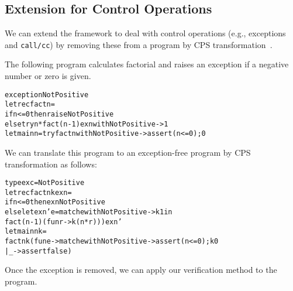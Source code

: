 \subsection{Extension for Control Operations}
\label{sec:control} We can extend the framework to deal with control
operations (e.g., exceptions and \texttt{call/cc}) by removing these
from a program by CPS transformation~\cite{Nielsen2001}.

The following program calculates factorial and raises an exception if
a negative number or zero is given.
\begin{alltt}
exception NotPositive
let rec fact n =
  if n <= 0 then raise NotPositive
  else try n * fact (n - 1) exn with NotPositive -> 1
let main n = try fact n with NotPositive -> assert (n <= 0); 0
\end{alltt}
We can translate this program to an exception-free program by CPS transformation as follows:
\begin{alltt}
type exc = NotPositive
let rec fact n k exn =
  if n <= 0 then exn NotPositive
  else let exn' e = match e with NotPositive -> k 1 in
         fact (n - 1) (fun r -> k (n * r))) exn'
let main n k =
  fact n k (fun e -> match e with NotPositive -> assert (n <= 0); k 0
                                | _ -> assert false)
\end{alltt}
Once the exception is removed, we can apply our verification method to the
program.

